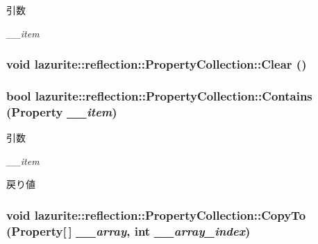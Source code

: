 \begin{DoxyParams}{引数}
\item[{\em \_\-\_\-item}]\end{DoxyParams}
\hypertarget{classlazurite_1_1reflection_1_1_property_collection_a013246552bc274658665ddd312652ea4}{
\subsubsection[{Clear}]{\setlength{\rightskip}{0pt plus 5cm}void lazurite::reflection::PropertyCollection::Clear ()}}
\label{classlazurite_1_1reflection_1_1_property_collection_a013246552bc274658665ddd312652ea4}
\hypertarget{classlazurite_1_1reflection_1_1_property_collection_a596aa4dc6e321203777ad16d4ecd6eda}{
\subsubsection[{Contains}]{\setlength{\rightskip}{0pt plus 5cm}bool lazurite::reflection::PropertyCollection::Contains ({\bf Property} {\em \_\-\_\-item})}}
\label{classlazurite_1_1reflection_1_1_property_collection_a596aa4dc6e321203777ad16d4ecd6eda}

\begin{DoxyParams}{引数}
\item[{\em \_\-\_\-item}]\end{DoxyParams}
\begin{DoxyReturn}{戻り値}

\end{DoxyReturn}
\hypertarget{classlazurite_1_1reflection_1_1_property_collection_a7f0f59d9949dc008da698cd2d6fc0790}{
\subsubsection[{CopyTo}]{\setlength{\rightskip}{0pt plus 5cm}void lazurite::reflection::PropertyCollection::CopyTo ({\bf Property}\mbox{[}$\,$\mbox{]} {\em \_\-\_\-array}, \/  int {\em \_\-\_\-array\_\-index})}}
\label{classlazurite_1_1reflection_1_1_property_collection_a7f0f59d9949dc008da698cd2d6fc0790}

